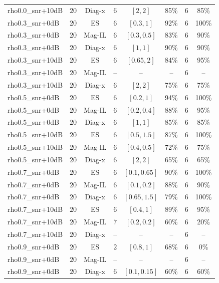 \begin{longtable}{@{}lccccccc@{}}
rho0.0\_snr+10dB & \(20\) & Diag-x & \(6\) & \([2, 2]\) & 85\% & \(6\) & 85\% \\
rho0.3\_snr+0dB & \(20\) & ES & \(6\) & \([0.3, 1]\) & 92\% & \(6\) & 100\% \\
rho0.3\_snr+0dB & \(20\) & Mag-IL & \(6\) & \([0.3, 0.5]\) & 83\% & \(6\) & 90\% \\
rho0.3\_snr+0dB & \(20\) & Diag-x & \(6\) & \([1, 1]\) & 90\% & \(6\) & 90\% \\
rho0.3\_snr+10dB & \(20\) & ES & \(6\) & \([0.65, 2]\) & 84\% & \(6\) & 95\% \\
rho0.3\_snr+10dB & \(20\) & Mag-IL & -- & -- & -- & \(6\) & -- \\
rho0.3\_snr+10dB & \(20\) & Diag-x & \(6\) & \([2, 2]\) & 75\% & \(6\) & 75\% \\
rho0.5\_snr+0dB & \(20\) & ES & \(6\) & \([0.2, 1]\) & 94\% & \(6\) & 100\% \\
rho0.5\_snr+0dB & \(20\) & Mag-IL & \(6\) & \([0.2, 0.4]\) & 88\% & \(6\) & 95\% \\
rho0.5\_snr+0dB & \(20\) & Diag-x & \(6\) & \([1, 1]\) & 85\% & \(6\) & 85\% \\
rho0.5\_snr+10dB & \(20\) & ES & \(6\) & \([0.5, 1.5]\) & 87\% & \(6\) & 100\% \\
rho0.5\_snr+10dB & \(20\) & Mag-IL & \(6\) & \([0.4, 0.5]\) & 72\% & \(6\) & 75\% \\
rho0.5\_snr+10dB & \(20\) & Diag-x & \(6\) & \([2, 2]\) & 65\% & \(6\) & 65\% \\
rho0.7\_snr+0dB & \(20\) & ES & \(6\) & \([0.1, 0.65]\) & 90\% & \(6\) & 100\% \\
rho0.7\_snr+0dB & \(20\) & Mag-IL & \(6\) & \([0.1, 0.2]\) & 88\% & \(6\) & 90\% \\
rho0.7\_snr+0dB & \(20\) & Diag-x & \(6\) & \([0.65, 1.5]\) & 79\% & \(6\) & 100\% \\
rho0.7\_snr+10dB & \(20\) & ES & \(6\) & \([0.4, 1]\) & 89\% & \(6\) & 95\% \\
rho0.7\_snr+10dB & \(20\) & Mag-IL & \(7\) & \([0.2, 0.2]\) & 60\% & \(6\) & 20\% \\
rho0.7\_snr+10dB & \(20\) & Diag-x & -- & -- & -- & \(6\) & -- \\
rho0.9\_snr+0dB & \(20\) & ES & \(2\) & \([0.8, 1]\) & 68\% & \(6\) & 0\% \\
rho0.9\_snr+0dB & \(20\) & Mag-IL & -- & -- & -- & \(6\) & -- \\
rho0.9\_snr+0dB & \(20\) & Diag-x & \(6\) & \([0.1, 0.15]\) & 60\% & \(6\) & 60\% \\

\end{longtable}

